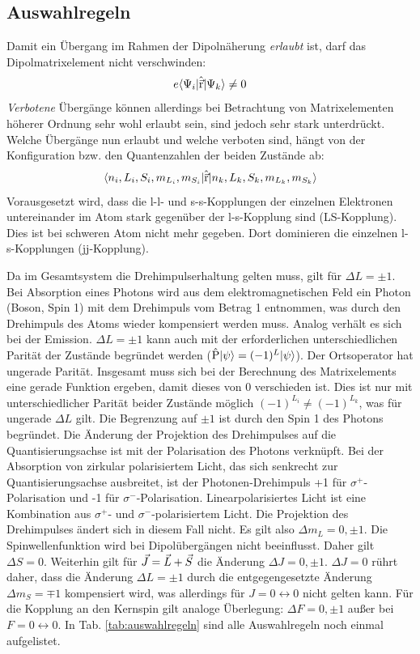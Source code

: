 \subsection{Auswahlregeln}\label{subsec:auswahlregeln}
Damit ein Übergang im Rahmen der Dipolnäherung \textit{erlaubt} ist, darf das
Dipolmatrixelement nicht verschwinden:
\begin{equation}\label{eq:dipolmatrixelement}
	e\langle{\Psi_i}|\hat{\vec{\mathrm{r}}}|{\Psi_k}\rangle\neq0
\end{equation}
\textit{Verbotene} Übergänge können allerdings bei Betrachtung von
Matrixelementen höherer Ordnung sehr wohl erlaubt sein, sind jedoch sehr stark
unterdrückt. Welche Übergänge nun erlaubt und welche verboten sind, hängt von
der Konfiguration bzw. den Quantenzahlen der beiden Zustände ab:
\begin{equation}\label{eq:dipolmatrixelement_quantenzahlen}
	\langle{n_i,L_i,S_i,m_{L_i}, m_{S_i}}|\hat{\vec{\mathrm{r}}}|{n_k,L_k,S_k,m_{L_k}, m_{S_k}}\rangle
\end{equation}
Vorausgesetzt wird, dass die l-l- und s-s-Kopplungen der einzelnen Elektronen
untereinander im Atom stark gegenüber der l-s-Kopplung sind (LS-Kopplung).
Dies ist bei schweren Atom nicht mehr gegeben. Dort dominieren die einzelnen
l-s-Kopplungen (jj-Kopplung).\par
Da im Gesamtsystem die Drehimpulserhaltung
gelten muss, gilt für $\Delta L =\pm1$. Bei Absorption eines Photons wird aus
dem elektromagnetischen Feld ein Photon (Boson, Spin 1) mit dem Drehimpuls vom
Betrag 1 entnommen, was durch den Drehimpuls des Atoms wieder kompensiert werden
muss. Analog verhält es sich bei der Emission. $\Delta L =\pm1$ kann auch mit
der erforderlichen unterschiedlichen Parität der Zustände begründet werden
($\hat{\mathrm{P}}|{\psi}\rangle=(-1)^L|{\psi}\rangle$). Der Ortsoperator hat ungerade Parität.
Insgesamt muss sich bei der Berechnung des Matrixelements eine gerade Funktion
ergeben, damit dieses von 0 verschieden ist. Dies ist nur mit unterschiedlicher
Parität beider Zustände möglich $(-1)^{L_i}\neq(-1)^{L_k}$, was für ungerade
$\Delta L$ gilt. Die Begrenzung auf $\pm1$ ist durch den Spin 1 des Photons
begründet. Die Änderung der Projektion des Drehimpulses auf die
Quantisierungsachse ist mit der Polarisation des Photons verknüpft. Bei der
Absorption von zirkular polarisiertem Licht, das sich senkrecht zur
Quantisierungsachse ausbreitet, ist der Photonen-Drehimpuls +1 für
$\sigma^+$-Polarisation und -1 für $\sigma^-$-Polarisation. Linearpolarisiertes
Licht ist eine Kombination aus $\sigma^+$- und $\sigma^-$-polarisiertem Licht.
Die Projektion des Drehimpulses ändert sich in diesem Fall nicht. Es gilt also
$\Delta m_L = 0, \pm1$. Die Spinwellenfunktion wird bei Dipolübergängen nicht
beeinflusst. Daher gilt $\Delta S=0$. Weiterhin gilt für $\vec{J}=\vec{L}+\vec{S}$ die
Änderung $\Delta J=0,\pm1$. $\Delta J=0$ rührt daher, dass die Änderung $\Delta
L=\pm1$ durch die entgegengesetzte Änderung $\Delta m_S=\mp1$ kompensiert wird,
was allerdings für $J=0\leftrightarrow0$ nicht gelten kann. Für die Kopplung an
den Kernspin gilt analoge Überlegung: $\Delta F = 0, \pm1$ außer bei
$F=0\leftrightarrow0$. In Tab. \ref{tab:auswahlregeln} sind alle
Auswahlregeln noch einmal aufgelistet.

